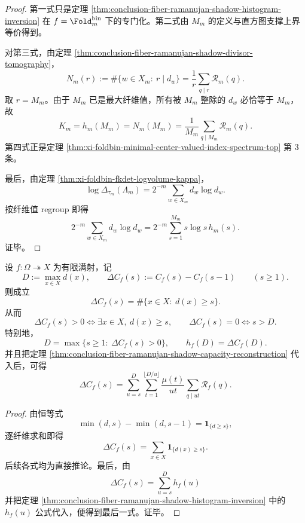\begin{proof}
第一式只是定理 \ref{thm:conclusion-fiber-ramanujan-shadow-histogram-inversion} 在 \(f=\Fold_m^{\mathrm{bin}}\) 下的专门化。第二式由 \(M_m\) 的定义与直方图支撑上界等价得到。

对第三式，由定理 \ref{thm:conclusion-fiber-ramanujan-shadow-divisor-tomography}，
\[
N_m(r):=\#\{w\in X_m:\ r\mid d_w\}
=
\frac1r\sum_{q\mid r}\mathscr R_m(q).
\]
取 \(r=M_m\)。由于 \(M_m\) 已是最大纤维值，所有被 \(M_m\) 整除的 \(d_w\) 必恰等于 \(M_m\)，故
\[
K_m=h_m(M_m)=N_m(M_m)=\frac1{M_m}\sum_{q\mid M_m}\mathscr R_m(q).
\]
第四式正是定理 \ref{thm:xi-foldbin-minimal-center-valued-index-spectrum-top} 第 \(3\) 条。

最后，由定理 \ref{thm:xi-foldbin-fkdet-logvolume-kappa}，
\[
\log\Delta_{\tau_m}(\Lambda_m)
=
2^{-m}\sum_{w\in X_m}d_w\log d_w.
\]
按纤维值 regroup 即得
\[
2^{-m}\sum_{w\in X_m}d_w\log d_w
=
2^{-m}\sum_{s=1}^{M_m}s\log s\,h_m(s).
\]
证毕。
\end{proof}

\begin{proposition}\label{prop:conclusion-capacity-ramanujan-plateau-law}
设 \(f:\Omega\twoheadrightarrow X\) 为有限满射，记
\[
D:=\max_{x\in X}d(x),
\qquad
\Delta C_f(s):=C_f(s)-C_f(s-1)
\qquad(s\ge 1).
\]
则成立
\[
\Delta C_f(s)=\#\{x\in X:\ d(x)\ge s\}.
\]
从而
\[
\Delta C_f(s)>0 \iff \exists x\in X,\ d(x)\ge s,
\qquad
\Delta C_f(s)=0 \iff s>D.
\]
特别地，
\[
D=\max\{s\ge 1:\ \Delta C_f(s)>0\},
\qquad
h_f(D)=\Delta C_f(D).
\]
并且把定理 \ref{thm:conclusion-fiber-ramanujan-shadow-capacity-reconstruction} 代入后，可得
\[
\Delta C_f(s)
=
\sum_{u=s}^{D}
\sum_{t=1}^{\lfloor D/u\rfloor}
\frac{\mu(t)}{ut}\sum_{q\mid ut}\mathscr R_f(q).
\]
\end{proposition}

\begin{proof}
由恒等式
\[
\min(d,s)-\min(d,s-1)=\mathbf 1_{\{d\ge s\}},
\]
逐纤维求和即得
\[
\Delta C_f(s)=\sum_{x\in X}\mathbf 1_{\{d(x)\ge s\}}.
\]
后续各式均为直接推论。最后，由
\[
\Delta C_f(s)=\sum_{u=s}^{D}h_f(u)
\]
并把定理 \ref{thm:conclusion-fiber-ramanujan-shadow-histogram-inversion} 中的 \(h_f(u)\) 公式代入，便得到最后一式。证毕。
\end{proof}

